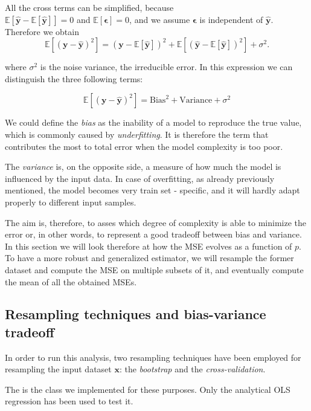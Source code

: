 \documentclass[11pt,a4paper,twocolumn]{article}
\let\oldtexttt\texttt
\renewcommand{\texttt}[1]{\tcbox{\oldtexttt{#1}}}
\begin{document}
All the cross terms can be simplified, because \\ $\mathbb{E}[\hat{ \boldsymbol{y}} - \mathbb{E}[\hat{ \boldsymbol{y}}]] = 0$ and $\mathbb{E}[\boldsymbol{\epsilon}] = 0$, and we assume $\boldsymbol{\epsilon}$ is independent of $\hat{\boldsymbol{y}}$. Therefore we obtain
\[
\mathbb{E}\left[(\boldsymbol{y} -\hat{\boldsymbol{y}})^2\right]
=(\boldsymbol{y}-\mathbb{E}[\hat{\boldsymbol{y}}])^2
+ \mathbb{E}\left[(\hat{\boldsymbol{y}} -\mathbb{E}[\hat{\boldsymbol{y}}])^2\right]
+ \sigma^2.
\]

where $\sigma^2$ is the noise variance, the irreducible error.
In this expression we can distinguish the three following terms:

\begin{equation} \label{eq:errdec}
	\mathbb{E}\left[(\boldsymbol{y} -\hat{\boldsymbol{y}})^2\right] = \mathrm{Bias}^2 + \mathrm{Variance} + \sigma^2
\end{equation}

We could define the \emph{bias} as the inability of a model to reproduce the true value, which is commonly caused by \emph{underfitting}. It is therefore the term that contributes the most to total error when the model complexity is too poor. 

The \emph{variance} is, on the opposite side, a measure of how much the model is influenced by the input data. In case of overfitting, as already previously mentioned, the model becomes very train set - specific, and it will hardly adapt properly to different input samples. 

The aim is, therefore, to asses which degree of complexity is able to minimize the error or, in other words, to represent a good tradeoff between bias and variance. In this section we will look therefore at how the MSE evolves as a function of $p$. To have a more robust and generalized estimator, we will resample the former dataset and compute the MSE on multiple subsets of it, and eventually compute the mean of all the obtained MSEs.

\subsection{Resampling techniques and bias-variance tradeoff}
In order to run this analysis, two resampling techniques have been employed for resampling the input dataset $\boldsymbol{x}$: the \emph{bootstrap} and the \emph{cross-validation}. 

The \texttt{BiasVarianceTradeoff} is the class we implemented for these purposes. Only the analytical OLS regression has been used to test it.
\end{document}

